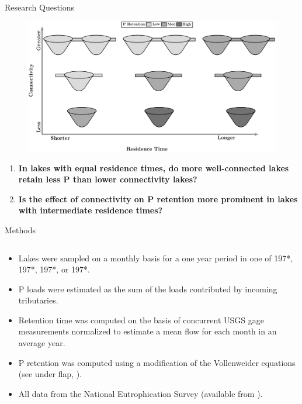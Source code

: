 \documentclass[final,hyperref={pdfpagelabels=false}]{beamer}
\begin{document}
\begin{frame}[t]
\begin{columns}[t]
\begin{column}{.465\textwidth}
{\begin{block}{Research Questions}
\begin{figure}
\includegraphics[width=\linewidth]{conny_framework.png}
\end{figure}

\begin{enumerate} \large 
\item \textbf{In lakes with equal residence times, do more well-connected lakes retain less P than lower connectivity lakes?}
\item \textbf{Is the effect of connectivity on P retention more prominent in lakes with intermediate residence times?}
\end{enumerate}

\end{block}
}

\begin{block}{Methods}

\begin{columns} %
\begin{column}{\textwidth} %
\begin{itemize}
\item Lakes were sampled on a monthly basis for a one year period in one of 197*, 197*, 197*, or 197*.
\item P loads were estimated as the sum of the loads contributed by incoming tributaries.
\item Retention time was computed on the basis of concurrent USGS gage measurements normalized to estimate a mean flow for each month in an average year.
\item P retention was computed using a modification of the Vollenweider equations (see under flap, \cite{Brettreviewreassessmentlake2007}).
\item All data from the National Eutrophication Survey (available from \cite{StachelekNationalEutrophicationSurvey2017}).
\end{itemize}
\end{column}


\end{columns}
\end{block}
\end{column}
\end{columns}
\end{frame}
\end{document}
